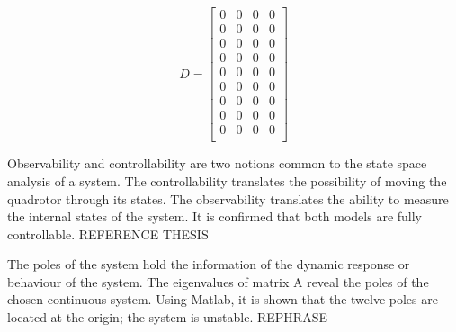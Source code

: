   \begin{equation}
 	D=\begin{bmatrix}
 	0 & 0 & 0 & 0 \\
 	0 & 0 & 0 & 0 \\
 	0 & 0 & 0 & 0 \\
 	0 & 0 & 0 & 0 \\
 	0 & 0 & 0 & 0 \\
 	0 & 0 & 0 & 0 \\
 	0 & 0 & 0 & 0 \\
 	0 & 0 & 0 & 0 \\
 	0 & 0 & 0 & 0 \\
 	\end{bmatrix}
 \end{equation}
 
Observability and controllability are two notions common to the state space analysis of a system. The controllability translates the possibility of moving the quadrotor through its states. The observability translates the ability to measure the internal states of the system. It is confirmed that both models are fully controllable. REFERENCE THESIS

The poles of the system hold the information of the dynamic response or behaviour of the system. The eigenvalues of matrix A reveal the poles of the chosen continuous system. Using Matlab, it is shown that the twelve poles are located at the origin; the system is unstable. REPHRASE

